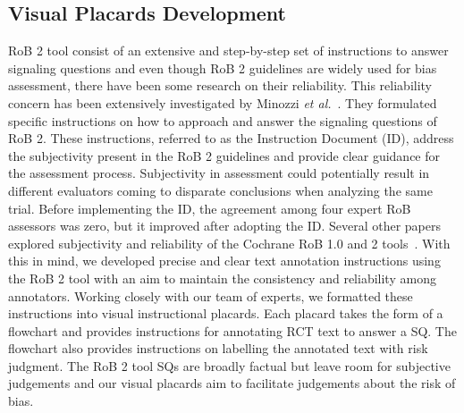\documentclass[sn-mathphys,Numbered]{sn-jnl}%
\theoremstyle{thmstyleone}%
\theoremstyle{thmstyletwo}%
\theoremstyle{thmstylethree}%
\begin{document}
\subsection{Visual Placards Development}
\label{guidelines}
%
RoB 2 tool consist of an extensive and step-by-step set of instructions to answer signaling questions and even though RoB 2 guidelines are widely used for bias assessment, there have been some research on their reliability.
This reliability concern has been extensively investigated by Minozzi \textit{et al.}~\cite{minozzi2020revised,minozzi2022reliability}. 
They formulated specific instructions on how to approach and answer the signaling questions of RoB 2.
These instructions, referred to as the Instruction Document (ID), address the subjectivity present in the RoB 2 guidelines and provide clear guidance for the assessment process.
Subjectivity in assessment could potentially result in different evaluators coming to disparate conclusions when analyzing the same trial.
Before implementing the ID, the agreement among four expert RoB assessors was zero, but it improved after adopting the ID.
Several other papers explored subjectivity and reliability of the Cochrane RoB 1.0 and 2 tools~\cite{minozzi2022reliability,da2017effect,loef2022interrater,minozzi2020revised}.
With this in mind, we developed precise and clear text annotation instructions using the RoB 2 tool with an aim to maintain the consistency and reliability among annotators.
Working closely with our team of experts, we formatted these instructions into visual instructional placards.
Each placard takes the form of a flowchart and provides instructions for annotating RCT text to answer a SQ.
The flowchart also provides instructions on labelling the annotated text with risk judgment.
The RoB 2 tool SQs are broadly factual but leave room for subjective judgements and our visual placards aim to facilitate judgements about the risk of bias.
%
%
%
\end{document}
